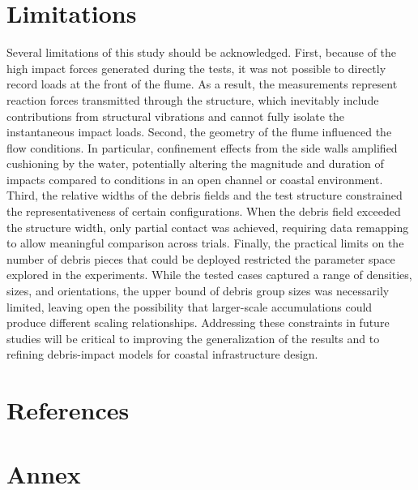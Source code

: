 \documentclass{article}
\begin{document}
\section{Limitations}
Several limitations of this study should be acknowledged. First, because of the high impact forces generated during the tests, it was not possible to directly record loads at the front of the flume. As a result, the measurements represent reaction forces transmitted through the structure, which inevitably include contributions from structural vibrations and cannot fully isolate the instantaneous impact loads. Second, the geometry of the flume influenced the flow conditions. In particular, confinement effects from the side walls amplified cushioning by the water, potentially altering the magnitude and duration of impacts compared to conditions in an open channel or coastal environment. Third, the relative widths of the debris fields and the test structure constrained the representativeness of certain configurations. When the debris field exceeded the structure width, only partial contact was achieved, requiring data remapping to allow meaningful comparison across trials. Finally, the practical limits on the number of debris pieces that could be deployed restricted the parameter space explored in the experiments. While the tested cases captured a range of densities, sizes, and orientations, the upper bound of debris group sizes was necessarily limited, leaving open the possibility that larger-scale accumulations could produce different scaling relationships. Addressing these constraints in future studies will be critical to improving the generalization of the results and to refining debris-impact models for coastal infrastructure design.

\section{References}
  

\section{Annex}
\end{document}
